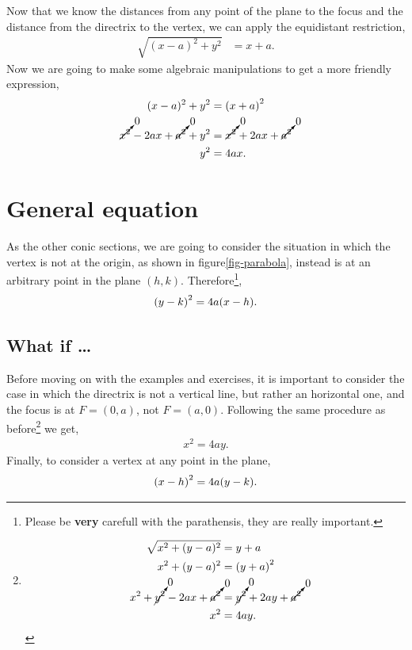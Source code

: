 \documentclass[../main-notes.tex]{subfiles}
\begin{document}
Now that we know the distances from any point of the plane to the focus and the distance from the directrix to the vertex, we can apply the equidistant restriction,
\begin{align*}
    \sqrt{(x-a)^2 + y^2} &= x+a.
\end{align*}
Now we are going to make some algebraic manipulations to get a more friendly expression,
\begin{align*}
    (x-a)^2 + y^2 &= \qty(x+a)^2 \\
    \cancelto{0}{x^2} -2ax +\cancelto{0}{a^2} + y^2 &= \cancelto{0}{x^2} +2ax +\cancelto{0}{a^2} \\
    y^2 &= 4ax. 
\end{align*}

\section{General equation}

As the other conic sections, we are going to consider the situation in which the vertex is not at the origin, as shown in figure\ref{fig-parabola}, instead is at an arbitrary point in the plane $(h,k)$.
Therefore\footnote{Please be \textbf{very} carefull with the parathensis, they are really important.},
\begin{gather*}
    \qty(y-k)^2 = 4a\qty(x-h).
\end{gather*}

\subsection{What if \ldots}

Before moving on with the examples and exercises, it is important to consider the case in which the directrix is not a vertical line, but rather an horizontal one, and the focus is at $F=(0,a)$, not $F=(a,0)$.
Following the same procedure as before\footnote{
\begin{align*}
    \sqrt{x^2 + (y-a)^2} &= y+a \\
    x^2 + (y-a)^2 &= \qty(y+a)^2 \\
    x^2 + \cancelto{0}{y^2} -2ax +\cancelto{0}{a^2} &= \cancelto{0}{y^2} +2ay +\cancelto{0}{a^2} \\
    x^2 &= 4ay. 
\end{align*}
}
we get,
\begin{gather*}
    x^2 = 4ay.
\end{gather*}
Finally, to consider a vertex at any point in the plane,
\begin{gather*}
    \qty(x-h)^2 = 4a\qty(y-k).
\end{gather*}
\end{document}

